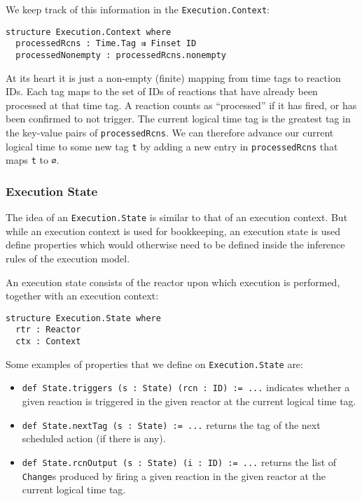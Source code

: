 We keep track of this information in the \lstinline{Execution.Context}:

\begin{lstlisting}
structure Execution.Context where
  processedRcns : Time.Tag ⇉ Finset ID
  processedNonempty : processedRcns.nonempty
\end{lstlisting}

At its heart it is just a non-empty (finite) mapping from time tags to reaction IDs.
Each tag maps to the set of IDs of reactions that have already been processed at that time tag.
A reaction counts as ``processed'' if it has fired, or has been confirmed to not trigger.
The current logical time tag is the greatest tag in the key-value pairs of \lstinline{processedRcns}.
We can therefore advance our current logical time to some new tag \lstinline{t} by adding a new entry in \lstinline{processedRcns} that maps \lstinline{t} to \lstinline{∅}.

\subsubsection{Execution State}

The idea of an \lstinline{Execution.State} is similar to that of an execution context.
But while an execution context is used for bookkeeping, an execution state is used define properties which would otherwise need to be defined inside the inference rules of the execution model.

An execution state consists of the reactor upon which execution is performed, together with an execution context:

\begin{lstlisting}
structure Execution.State where
  rtr : Reactor
  ctx : Context
\end{lstlisting}

Some examples of properties that we define on \lstinline{Execution.State} are:

\begin{itemize}
  \item \lstinline{def State.triggers (s : State) (rcn : ID) := ...} indicates whether a given reaction is triggered in the given reactor at the current logical time tag. 
  \item \lstinline{def State.nextTag (s : State) := ...} returns the tag of the next scheduled action (if there is any). 
  \item \lstinline{def State.rcnOutput (s : State) (i : ID) := ...} returns the list of \lstinline{Change}s produced by firing a given reaction in the given reactor at the current logical time tag.
\end{itemize}

